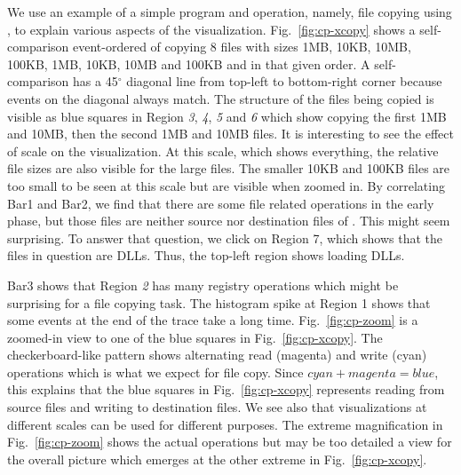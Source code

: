 We use an example of a simple program and operation,
namely, file copying using \xcopy{}, to explain various
aspects of the \VDP{} visualization.
Fig.~\ref{fig:cp-xcopy} shows a self-comparison event-ordered \VDP{} of
\xcopy{} copying 8 files with sizes
1MB, 10KB, 10MB, 100KB, 1MB, 10KB, 10MB and 100KB and in that given order.
A self-comparison \VDP{} has a 45$^\circ$ diagonal line from top-left to 
bottom-right corner because events on the diagonal always match.
The structure of the files being copied is visible as blue squares in
Region {\em 3}, {\em 4}, {\em 5} and {\em 6} which show copying the
first 1MB and 10MB, then the second 1MB and 10MB files.
It is interesting to see the effect of scale on the visualization.
At this scale, which shows everything, the relative file sizes are also
visible for the large files.  The smaller 10KB and 100KB files are 
too small to be seen at this scale but are visible when zoomed in.
By correlating Bar1 and Bar2,
we find that there are some file related operations in the early phase,
but those files are neither source nor destination files of \xcopy{}.
This might seem surprising. To answer that question, we
click on Region 7, which shows that
the files in question are DLLs. Thus, the top-left region 
shows \xcopy{} loading DLLs.

Bar3 shows that Region {\em 2} has many registry operations which might
be surprising for a file copying task.
The histogram spike at Region 1 shows that some events at the end of the
trace take a long time.
Fig.~\ref{fig:cp-zoom} is a zoomed-in view to one of the blue squares in
Fig.~\ref{fig:cp-xcopy}.
The checkerboard-like pattern shows alternating read (magenta) and write
(cyan) operations which is what we expect for file copy.
Since $cyan+magenta=blue$,
this explains that the blue squares in Fig.~\ref{fig:cp-xcopy} represents
reading from source files and writing to destination files.
We see also that visualizations at different scales can be used for
different purposes.
The extreme magnification in Fig.~\ref{fig:cp-zoom}
shows the actual operations but may be too detailed a view for
the overall picture which emerges at the other extreme in 
Fig.~\ref{fig:cp-xcopy}.

